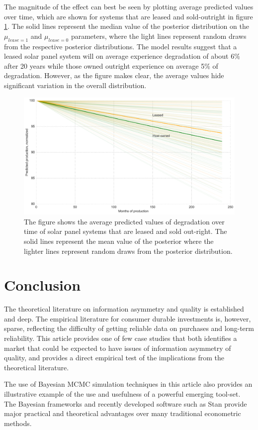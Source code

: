 \documentclass[12pt]{article}
\begin{document}
The magnitude of the effect can best be seen by plotting average predicted values over time, which are shown for systems that are leased and sold-outright in figure \ref{predicted_deg}. The solid lines represent the median value of the posterior distribution on the $\mu_{lease=1}$ and $\mu_{lease=0}$ parameters, where the light lines represent random draws from the respective posterior distributions. The model results suggest that a leased solar panel system will on average experience degradation of about 6\% after 20 years while those owned outright experience on average 5\% of degradation. However, as the figure makes clear, the average values hide significant variation in the overall distribution.

\begin{figure}
	\includegraphics[width=1\textwidth]{figures/predicted_deg.png}
	\caption{The figure shows the average predicted values of degradation over time of solar panel systems that are leased and sold out-right. The solid lines represent the mean value of the posterior where the lighter lines represent random draws from the posterior distribution.}
	\label{predicted_deg}
\end{figure}

\section{Conclusion}
The theoretical literature on information asymmetry and quality is established and deep. The empirical literature for consumer durable investments is, however, sparse, reflecting the difficulty of getting reliable data on purchases and long-term reliability. This article provides one of few case studies that both identifies a market that could be expected to have issues of information asymmetry of quality, and provides a direct empirical test of the implications from the theoretical literature.  

The use of Bayesian MCMC simulation techniques in this article also provides an illustrative example of the use and usefulness of a powerful emerging tool-set. The Bayesian frameworks and recently developed software such as Stan provide major practical and theoretical advantages over many traditional econometric methods.

\begin{spacing}{1}



\FloatBarrier

\end{spacing}
\end{document}
